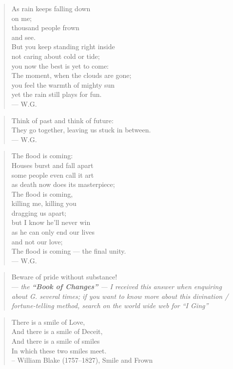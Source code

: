 \begin{quote}
As rain keeps falling down\\
on me;\\
thousand people frown\\
and see.\\
But you keep standing right inside\\
not caring about cold or tide;\\
you now the best is yet to come:\\
The moment, when the clouds are gone;\\
you feel the warmth of mighty sun\\
yet the rain still plays for fun. \\
--- W.G.
\end{quote}

\begin{quote}
Think of past and think of future:\\
They go together, leaving us stuck in between.\\
--- W.G.
\end{quote}

\begin{quote}
The flood is coming:\\
Houses burst and fall apart\\
some people even call it art\\
as death now does its masterpiece;\\
The flood is coming,\\
killing me, killing you\\
dragging us apart;\\
but I know he'll never win\\
as he can only end our lives\\
and not our love;\\
The flood is coming --- the final unity.\\
--- W.G.
\end{quote}

\begin{quote}
Beware of pride without substance!\\
--- \emph{the \textbf{\enquote{Book of Changes}} --- I received this answer when enquiring about G. several times; if you want to know more about this divination / fortune-telling method, search on the world wide web for \enquote{I Ging}}
\end{quote}

\begin{quote}
There is a smile of Love,\\
And there is a smile of Deceit,\\
And there is a smile of smiles\\
In which these two smiles meet.\\
-- William Blake (1757--1827), Smile and Frown
\end{quote}

